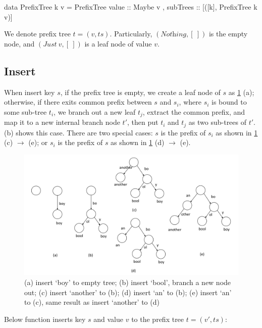 \documentclass[b5paper]{article}
\begin{document}
\begin{Haskell}
data PrefixTree k v = PrefixTree { value :: Maybe v
                                 , subTrees :: [([k], PrefixTree k v)]}
\end{Haskell}

We denote prefix tree $t = (v, ts)$. Particularly, $(\textit{Nothing}, [\ ])$ is the empty node, and $(\textit{Just}\ v, [\ ])$ is a leaf node of value $v$.

\subsection{Insert}
When insert key $s$, if the prefix tree is empty, we create a leaf node of $s$ as \cref{fig:patricia-insert} (a); otherwise, if there exits common prefix between $s$ and $s_i$, where $s_i$ is bound to some sub-tree $t_i$, we branch out a new leaf $t_j$, extract the common prefix, and map it to a new internal branch node $t'$, then put $t_i$ and $t_j$ as two sub-trees of $t'$.  (b) shows this case. There are two special cases: $s$ is the prefix of $s_i$ as shown in \cref{fig:patricia-insert} (c) $\to$ (e); or $s_i$ is the prefix of $s$ as shown in \cref{fig:patricia-insert} (d) $\to$ (e).

\begin{figure}[htbp]
  \centering
  \includegraphics[scale=0.4]{img/prefix-tree-insert}
  \caption{(a) insert `boy' to empty tree; (b) insert `bool', branch a new node out; (c) insert `another' to (b); (d) insert `an' to (b); (e) insert `an' to (c), same result as insert `another' to (d)}
  \label{fig:patricia-insert}
\end{figure}

Below function inserts key $s$ and value $v$ to the prefix tree $t = (v', ts)$:
\end{document}
